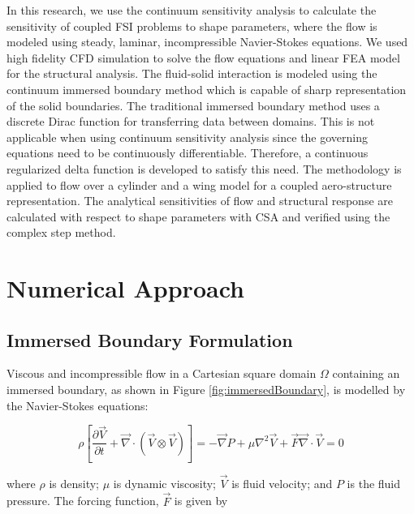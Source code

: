 \documentclass[12pt]{aiaa-pretty}
\begin{document}
In this research, we use the continuum sensitivity analysis to calculate the sensitivity of coupled FSI problems to shape parameters, where the flow is modeled using steady, laminar, incompressible Navier-Stokes equations. We used high fidelity CFD simulation to solve the flow equations and linear FEA model for the structural analysis. The fluid-solid interaction is modeled using the continuum immersed boundary method which is capable of sharp representation of the solid boundaries. The traditional immersed boundary method uses a discrete Dirac function for transferring data between domains. This is not applicable when using continuum sensitivity analysis since the governing equations need to be continuously differentiable. Therefore, a continuous regularized delta function is developed to satisfy this need. The methodology is applied to flow over a cylinder and a wing model for a coupled aero-structure representation. The analytical sensitivities of flow and structural response are calculated with respect to shape parameters with CSA and verified using the complex step method.

\section{Numerical Approach}
\subsection{Immersed Boundary Formulation}
Viscous and incompressible flow in a Cartesian square domain $\Omega$ containing an immersed boundary, as shown in Figure \eqref{fig:immersedBoundary}, is modelled by the Navier-Stokes equations:

%
\begin{subequations}\label{eq:NS}
\begin{equation}
	\rho \left[
	\frac{\partial \vec{V}}{\partial t} + 
	\vec{\nabla} \cdot \left( \vec{V} \otimes \vec{V} \right) 
	\right] = 
	-\vec{\nabla} P + \mu \nabla^2 \vec{V} + \vec{F}
\end{equation}
\begin{equation}
	\vec{\nabla} \cdot \vec{V} = 0
\end{equation}
\end{subequations}
%

where $\rho$ is density; $\mu$ is dynamic viscosity; $\vec{V}$ is fluid velocity; and $P$ is the fluid pressure. The forcing function, $\vec{F}$ is given by
\end{document}
